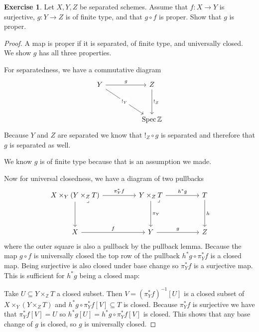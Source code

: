 \documentclass{article}
\newcommand{\Z}{\mathbb{Z}}
\DeclareMathOperator{\spec}{Spec}
\theoremstyle{definition}
\newtheorem{question}{Exercise}
\begin{document}
\begin{question}
    Let \(X,Y,Z\) be separated schemes. Assume that \(f:X\to Y\) is surjective,
    \(g:Y\to Z\) is of finite type, and that \(g\circ f\) is proper. Show that
    \(g\) is proper.

    \begin{proof}
        A map is proper if it is separated, of finite type, and universally
        closed. We show \(g\) has all three properties.

        For separatedness, we have a commutative diagram
        \[
            \begin{tikzcd}[ampersand replacement=\&]
                Y \&\& Z \\
                \\
                \&\& \spec\Z
                \arrow["g", from=1-1, to=1-3]
                \arrow["{!_{Z}}", from=1-3, to=3-3]
                \arrow["{!_{Y}}"{description}, from=1-1, to=3-3]
            \end{tikzcd}
        \]
        Because \(Y\) and \(Z\) are separated we know that \(!_{Z}\circ g\) is
        separated and therefore that \(g\) is separated as well.

        We know \(g\) is of finite type because that is an assumption we made.

        Now for universal closedness, we have a diagram of two pullbacks
        \[
            \begin{tikzcd}[ampersand replacement=\&]
                {X\times_{Y}(Y\times_{Z}T)} \&\& {Y\times_{Z}T} \&\& T \\
                \\
                X \&\& Y \&\& Z
                \arrow["g", from=3-3, to=3-5]
                \arrow["f", from=3-1, to=3-3]
                \arrow["h", from=1-5, to=3-5]
                \arrow["h^{*}g", from=1-3, to=1-5]
                \arrow["\pi_{Y}^{*}f", from=1-1, to=1-3]
                \arrow[from=1-1, to=3-1]
                \arrow["\pi_{Y}", from=1-3, to=3-3]
                \arrow["\lrcorner"{anchor=center, pos=0}, draw=none, from=1-3, to=3-5]
                \arrow["\lrcorner"{anchor=center, pos=0}, draw=none, from=1-1, to=3-3]
            \end{tikzcd}
        \]
        where the outer square is also a pullback by the pullback lemma. Because
        the map \(g\circ f\) is universally closed the top row of the pullback
        \(h^{*}g\circ\pi_{Y}^{*}f\) is a closed map. Being surjective is also
        closed under base change so \(\pi_{Y}^{*}f\) is a surjective map. This
        is sufficient for \(h^{*}g\) being a closed map:

        Take \(U\subseteq Y\times_{\Z}T\) a closed subset. Then
        \(V=(\pi_{Y}^{*}f)^{-1}[U]\) is a closed subset of
        \(X\times_{Y}(Y\times_{Z}T)\) and \(h^{*}g\circ \pi_{Y}^{*}f[V]\subseteq
        T\) is closed. Because \(\pi_{Y}^{*}f\) is surjective we have that
        \(\pi_{Y}^{*}f[V]=U\) so \(h^{*}g[U]=h^{*}g\circ \pi_{Y}^{*}f[V]\) is
        closed. This shows that any base change of \(g\) is closed, so \(g\) is
        universally closed.
    \end{proof}
\end{question}
\end{document}
